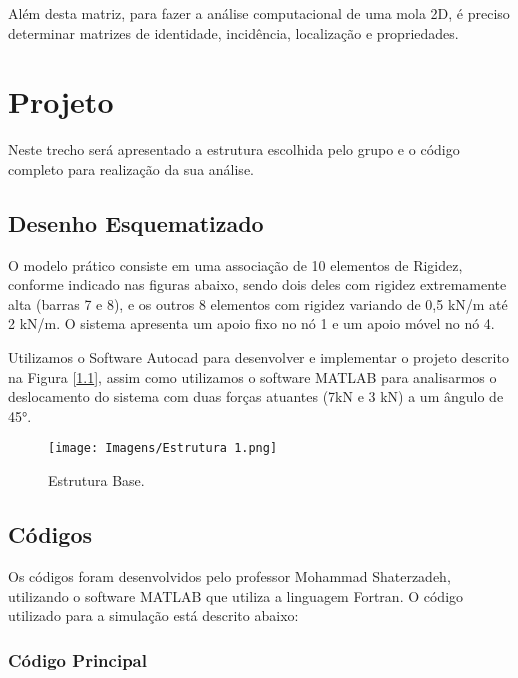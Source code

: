 \documentclass[deposito, acronym, symbols]{fei}
\begin{document}
Além desta matriz, para fazer a análise computacional de uma mola 2D, é preciso determinar matrizes de identidade, incidência, localização e propriedades.

\chapter{Projeto}

Neste trecho será apresentado a estrutura escolhida pelo grupo e o código completo para realização da sua análise.

\section{Desenho Esquematizado}

O modelo prático consiste em uma associação de 10 elementos de Rigidez, conforme indicado nas figuras abaixo, sendo dois deles com rigidez extremamente alta (barras 7 e 8), e os outros 8 elementos com rigidez variando de 0,5 kN/m até 2 kN/m. O sistema apresenta um apoio fixo no nó 1 e um apoio móvel no nó 4. 

Utilizamos o Software Autocad para desenvolver e implementar o projeto descrito na Figura [\ref{fig: Estrutura}], assim como utilizamos o software MATLAB para analisarmos o deslocamento do sistema com duas forças atuantes (7kN e 3 kN) a um ângulo de 45°. 

\begin{figure}[!htb]
 \centering
    \caption{Estrutura Base.}
    \texttt{[image: Imagens/Estrutura 1.png]}
    \label{fig: Estrutura}
 \end{figure}

\section{Códigos}

Os códigos foram desenvolvidos pelo professor Mohammad Shaterzadeh, utilizando o software MATLAB que utiliza a linguagem Fortran. O código utilizado para a simulação está descrito abaixo:

\subsection{Código Principal}
\end{document}
